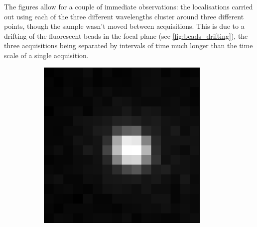 %
The figures allow for a couple of immediate observations:
the localisations carried out using each of the three different wavelengths cluster around three different points, though the sample wasn't moved between acquisitions.
This is due to a drifting of the fluorescent beads in the focal plane (see \autoref{fig:beads_drifting}), the three acquisitions being separated by intervals of time much longer than the time scale of a single acquisition.
%
\begin{figure}
    \centering
    \begin{subfigure}{0.32\textwidth}
        \includegraphics[width=\textwidth]{figures/beads_drifting_647nm.pdf}
        \caption{}
        \label{fig:beads_drifting_647nm}
    \end{subfigure}
    \begin{subfigure}{0.32\textwidth}

\end{subfigure}
\end{figure}

